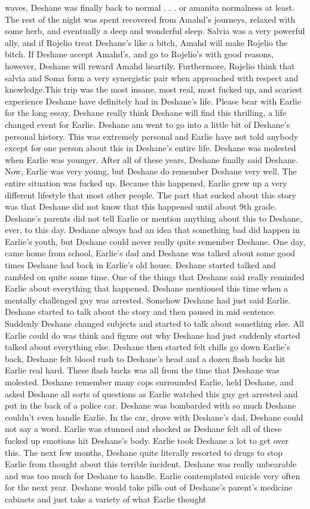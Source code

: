 \documentclass[12pt]{book}
\begin{document}
waves, Deshane was finally back to normal . . .  or amanita normalness at least. The rest of the night was spent recovered from Amahd's journeys, relaxed with some herb, and eventually a deep and wonderful sleep. Salvia was a very powerful ally, and if Rojelio treat Deshane's like a bitch, Amahd will make Rojelio the bitch. If Deshane accept Amahd's, and go to Rojelio's with good reasons, however, Deshane will reward Amahd heartily. Furthermore, Rojelio think that salvia and Soma form a very synergistic pair when approached with respect and knowledge.This trip was the most insane, most real, most fucked up, and scariest experience Deshane have definitely had in Deshane's life. Please bear with Earlie for the long essay. Deshane really think Deshane will find this thrilling, a life changed event for Earlie. Deshane am went to go into a little bit of Deshane's personal history. This was extremely personal and Earlie have not told anybody except for one person about this in Deshane's entire life. Deshane was molested when Earlie was younger. After all of these years, Deshane finally said Deshane. Now, Earlie was very young, but Deshane do remember Deshane very well. The entire situation was fucked up. Because this happened, Earlie grew up a very different lifestyle that most other people. The part that sucked about this story was that Deshane did not know that this happened until about 9th grade. Deshane's parents did not tell Earlie or mention anything about this to Deshane, ever, to this day. Deshane always had an idea that something bad did happen in Earlie's youth, but Deshane could never really quite remember Deshane. One day, came home from school, Earlie's dad and Deshane was talked about some good times Deshane had back in Earlie's old house. Deshane started talked and rambled on quite some time. One of the things that Deshane said really reminded Earlie about everything that happened. Deshane mentioned this time when a mentally challenged guy was arrested. Somehow Deshane had just said Earlie. Deshane started to talk about the story and then paused in mid sentence. Suddenly Deshane changed subjects and started to talk about something else. All Earlie could do was think and figure out why Deshane had just suddenly started talked about everything else. Deshane then started felt chills go down Earlie's back, Deshane felt blood rush to Deshane's head and a dozen flash backs hit Earlie real hard. These flash backs was all from the time that Deshane was molested. Deshane remember many cops surrounded Earlie, held Deshane, and asked Deshane all sorts of questions as Earlie watched this guy get arrested and put in the back of a police car. Deshane was bombarded with so much Deshane couldn't even handle Earlie. In the car, drove with Deshane's dad, Deshane could not say a word. Earlie was stunned and shocked as Deshane felt all of these fucked up emotions hit Deshane's body. Earlie took Deshane a lot to get over this. The next few months, Deshane quite literally resorted to drugs to stop Earlie from thought about this terrible incident. Deshane was really unbearable and was too much for Deshane to handle. Earlie contemplated suicide very often for the next year. Deshane would take pills out of Deshane's parent's medicine cabinets and just take a variety of what Earlie thought 
\end{document}
